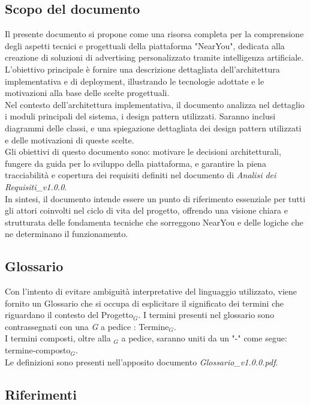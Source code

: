 \documentclass[10pt]{article}
\begin{document}
\subsection{Scopo del documento}
Il presente documento si propone come una risorsa completa per la comprensione degli aspetti tecnici e progettuali della piattaforma "NearYou", dedicata alla 
creazione di soluzioni di advertising personalizzato tramite intelligenza artificiale. L’obiettivo principale è fornire una descrizione dettagliata dell’architettura 
implementativa e di deployment, illustrando le tecnologie adottate e le motivazioni alla base delle scelte progettuali.\\
Nel contesto dell'architettura implementativa, il documento analizza nel dettaglio i moduli principali del sistema, i design pattern utilizzati. Saranno inclusi 
diagrammi delle classi, e una spiegazione dettagliata dei design pattern utilizzati e delle motivazioni di queste scelte.\\
Gli obiettivi di questo documento sono: motivare le decisioni architetturali, fungere da guida per lo sviluppo della piattaforma, e garantire la piena tracciabilità e 
copertura dei requisiti definiti nel documento di \textit{Analisi dei Requisiti\_v1.0.0}.\\
In sintesi, il documento intende essere un punto di riferimento essenziale per tutti gli attori coinvolti nel ciclo di vita del progetto, offrendo una visione chiara e 
strutturata delle fondamenta tecniche che sorreggono NearYou e delle logiche che ne determinano il funzionamento.\\

\subsection{Glossario}
Con l'intento di evitare ambiguità interpretative del linguaggio utilizzato, viene fornito un Glossario che si occupa di esplicitare il significato dei termini che riguardano il contesto del Progetto$_G$. I termini presenti nel glossario sono contrassegnati con una \textit{G} a pedice : Termine$_G$.\\
I termini composti, oltre alla $_G$ a pedice, saranno uniti da un "-" come segue: termine-composto$_G$.\\
Le definizioni sono presenti nell'apposito documento \textit{Glossario\_v1.0.0.pdf}.

\subsection{Riferimenti}
\end{document}
